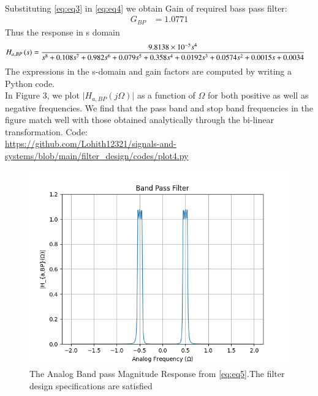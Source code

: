 \documentclass{article}
\begin{document}
\begin{itemize}
\begin{align}
\end{align}
Substituting \eqref{eq:eq3} in \eqref{eq:eq4} we obtain Gain of required bass pass filter:
\begin{align}
    G_{BP} &= 1.0771 
\end{align}
Thus the response in s domain 
\begin{align}
    H_{a,BP}\left(s\right) &= \frac{9.8138\times 10^{-5}s^4}{s^8 + 0.108s^7 + 0.982s^6 + 0.079s^5 + 0.358s^4 + 0.0192s^3 + 0.0574s^2 + 0.0015s + 0.0034} \label{eq:eq5}
\end{align}
The expressions in the s-domain and gain factors are computed by writing a Python code. \\
In Figure 3, we plot $\vert H_{a,BP}(j\Omega)\vert$ as a function of $\Omega$ for both positive as
well as negative frequencies.  We find that the pass band and stop band frequencies in the figure
match well with those obtained analytically through the bi-linear transformation.
Code:\\
\href{https://github.com/Lohith12321/signals-and-systems/blob/main/filter_design/codes/plot4.py}{https://github.com/Lohith12321/signals-and-systems/blob/main/filter_design/codes/plot4.py}
\begin{figure}[H]
\centering
\includegraphics[width=1\columnwidth]{figs/plot4.png}
\caption{The Analog Band pass Magnitude Response from \eqref{eq:eq5}.The filter design specifications are satisfied}
\label{fig:plot4}
\end{figure}
\end{itemize}
\end{document}
